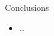 \begin{columns}[t]
\begin{column}{0.32\linewidth}
    \begin{purpleblock}{Conclusions}
      \begin{itemize}
        \item \dots
      \end{itemize}
    \end{purpleblock}

    \printbibliography[heading=none]

  \end{column}

\end{columns}

